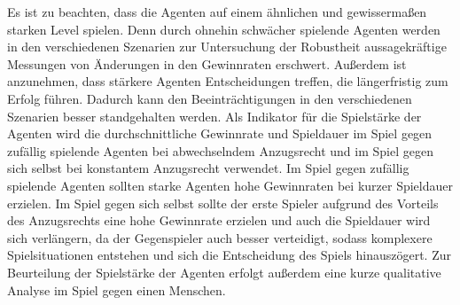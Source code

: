 Es ist zu beachten, dass die Agenten auf einem ähnlichen und gewissermaßen starken Level spielen. Denn durch ohnehin schwächer spielende Agenten werden in den verschiedenen Szenarien zur Untersuchung der Robustheit aussagekräftige Messungen von Änderungen in den Gewinnraten erschwert. Außerdem ist anzunehmen, dass stärkere Agenten Entscheidungen treffen, die längerfristig zum Erfolg führen. Dadurch kann den Beeinträchtigungen in den verschiedenen Szenarien besser standgehalten werden. Als Indikator für die Spielstärke der Agenten wird die durchschnittliche Gewinnrate und Spieldauer im Spiel gegen zufällig spielende Agenten bei abwechselndem Anzugsrecht und im Spiel gegen sich selbst bei konstantem Anzugsrecht verwendet. Im Spiel gegen zufällig spielende Agenten sollten starke Agenten hohe Gewinnraten bei kurzer Spieldauer erzielen. Im Spiel gegen sich selbst sollte der erste Spieler aufgrund des Vorteils des Anzugsrechts eine hohe Gewinnrate erzielen und auch die Spieldauer wird sich verlängern, da der Gegenspieler auch besser verteidigt, sodass komplexere Spielsituationen entstehen und sich die Entscheidung des Spiels hinauszögert. Zur Beurteilung der Spielstärke der Agenten erfolgt außerdem eine kurze qualitative Analyse im Spiel gegen einen Menschen.
